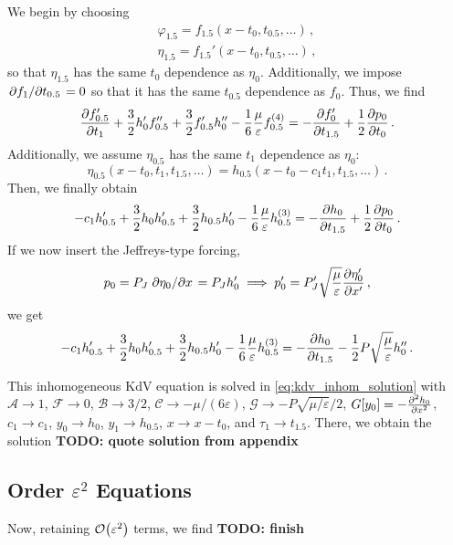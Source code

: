 \documentclass{jfm}
\let\Oldsubsection\subsection
\renewcommand{\subsection}{\FloatBarrier\Oldsubsection}
\renewcommand*{\epsilon}{\varepsilon}
\begin{document}
We begin by choosing
\begin{align}
  \varphi_{1.5} = f_{1.5}(x-t_0,t_{0.5},\ldots) \,, \\
  \eta_{1.5} = f_{1.5}'(x-t_0,t_{0.5},\ldots) \,,
\end{align}
so that $\eta_{1.5}$ has the same $t_0$ dependence as $\eta_0$.
Additionally, we impose $\pdv*{f_1}{t_{0.5}} = 0$ so that it has the
same $t_{0.5}$ dependence as $f_0$.
Thus, we find
\begin{equation}
  \pdv{f_{0.5}'}{t_1}
    + \frac{3}{2} h_0' f_{0.5}''
    + \frac{3}{2} f_{0.5}' h_0''
    - \frac{1}{6} \frac{\mu}{\epsilon} f_{0.5}^{(4)}
  =
  - \pdv{f_0'}{t_{1.5}}
    + \frac{1}{2} \pdv{p_0}{t_0}
    \,.
\end{equation}
Additionally, we assume $\eta_{0.5}$ has the same $t_1$ dependence as
$\eta_0$:
\begin{equation}
  \eta_{0.5}(x-t_0,t_1,t_{1.5},\ldots) = h_{0.5}(x - t_0 - c_1 t_1,
    t_{1.5}, \ldots) \,.
\end{equation}
Then, we finally obtain
\begin{equation}
    -c_1 h_{0.5}'
    + \frac{3}{2} h_0 h_{0.5}'
    + \frac{3}{2} h_{0.5} h_0'
    - \frac{1}{6} \frac{\mu}{\epsilon} h_{0.5}^{(3)}
  =
  - \pdv{h_0}{t_{1.5}}
    + \frac{1}{2} \pdv{p_0}{t_0}
    \,.
\end{equation}
If we now insert the Jeffreys-type forcing,
\begin{equation}
  p_0 = P_J \pdv*{\eta_0}{x} = P_J h_0'
  \implies p'_0 = P'_J \sqrt{\frac{\mu}{\epsilon}} \pdv{\eta'_0}{x'}
  \,,
\end{equation}
we get
\begin{equation}
    -c_1 h_{0.5}'
    + \frac{3}{2} h_0 h_{0.5}'
    + \frac{3}{2} h_{0.5} h_0'
    - \frac{1}{6} \frac{\mu}{\epsilon} h_{0.5}^{(3)}
  =
  - \pdv{h_0}{t_{1.5}}
    - \frac{1}{2} P \sqrt{\frac{\mu}{\epsilon}} h_0''
    \,.
\end{equation}

This inhomogeneous KdV equation is solved in
\cref{eq:kdv_inhom_solution} with $\mathcal{A} \to 1$, $\mathcal{F} \to
0$, $\mathcal{B} \to 3/2$, $\mathcal{C} \to -\mu/(6 \epsilon)$,
$\mathcal{G} \to -P \sqrt{\mu/\epsilon}/2$, $G[y_0] = -
\pdv[2]{h_0}{x}$, $c_1 \to c_1$, $y_0 \to h_0$, $y_1 \to h_{0.5}$, $x
\to x-t_0$, and $\tau_1 \to t_{1.5}$.
There, we obtain the solution
\textbf{TODO: quote solution from appendix}

\subsection{Order \texorpdfstring{$\epsilon^{2}$}{2} Equations}
Now, retaining $\order{\epsilon^2}$ terms, we find
\textbf{TODO: finish}
\end{document}

